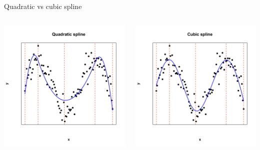 \documentclass[english]{beamer}
\begin{document}
\begin{frame}{Quadratic vs cubic spline}
\begin{columns}
    \begin{column}{0.5\textwidth}
        \centering
        \includegraphics[width=\linewidth]{images/quadratic_spline.jpeg} 
    \end{column}
    \begin{column}{0.5\textwidth}
        \centering
        \includegraphics[width=\linewidth]{images/cubic_spline.jpeg} 

\end{column}
\end{columns}
\end{frame}
\end{document}
